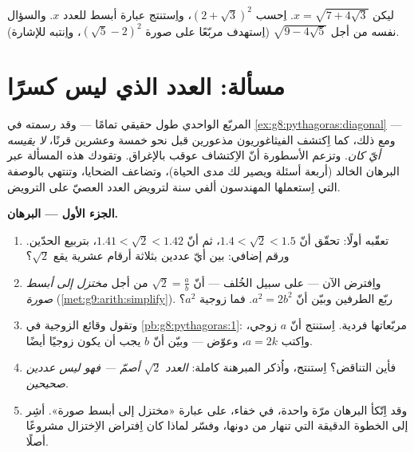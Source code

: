 \begin{exercise}[$\star\star\star$]\label{exo:g9:sqrt:10}
ليكن $x = \sqrt{7 + 4\sqrt3}$. اِحسب
$\left(2 + \sqrt3\right)^2$، واِستنتج عبارة أبسط للعدد $x$.
والسؤال نفسه من أجل $\sqrt{9 - 4\sqrt5}$ (اِستهدف مربّعًا على صورة
$\left(\sqrt5 - 2\right)^2$، واِنتبه للإشارة).
\end{exercise}

\section{مسألة: العدد الذي ليس كسرًا}

\begin{problem}
\label{pb:g9:sqrt:1}
 المربّع الواحدي طول حقيقي تمامًا --- وقد رسمته في
\cref{ex:g8:pythagoras:diagonal} --- ومع ذلك، كما اِكتشف
الفيثاغوريون مذعورين قبل نحو خمسة وعشرين قرنًا، \emph{لا يقيسه
أيّ  كان}. وتزعم الأسطورة أنّ الاِكتشاف عوقب بالإغراق.
وتقودك هذه المسألة عبر البرهان الخالد (أربعة أسئلة ويصير لك مدى
الحياة)، وتضاعف الضحايا، وتنتهي بالوصفة التي اِستعملها المهندسون
ألفي سنة لترويض العدد العصيّ على الترويض.

\medskip
\noindent\textbf{الجزء الأول --- البرهان.}
\begin{enumerate}
  \item تعقّبه أولًا: تحقّق أنّ
        $1.4 < \sqrt2 < 1.5$، ثم أنّ $1.41 < \sqrt2 < 1.42$،
        بتربيع الحدّين. ورقم إضافي: بين أيّ عددين بثلاثة أرقام
        عشرية يقع $\sqrt2$؟
  \item واِفترض الآن --- على سبيل الخُلف --- أنّ
        $\sqrt2 = \frac ab$ من أجل  \emph{مختزل إلى أبسط
        صورة} (\cref{met:g9:arith:simplify}). ربّع الطرفين وبيّن
        أنّ $a^2 = 2 b^2$. فما زوجية $a^2$؟
  \item وتقول وقائع الزوجية في \cref{pb:g8:pythagoras:1}:
         مربّعاتها فردية. اِستنتج أنّ $a$
        زوجي، واِكتب $a = 2k$، وعوّض --- وبيّن أنّ $b$ يجب
        أن يكون زوجيًا أيضًا.
  \item فأين التناقض؟ اِستنتج، واُذكر المبرهنة كاملة:
        \emph{العدد $\sqrt2$ أصمّ --- فهو ليس 
        عددين صحيحين}.
  \item وقد اِتّكأ البرهان مرّة واحدة، في خفاء، على عبارة «مختزل
        إلى أبسط صورة». أشِر إلى الخطوة الدقيقة التي تنهار من
        دونها، وفسّر لماذا كان اِفتراض الاِختزال مشروعًا أصلًا.
\end{enumerate}


\end{problem}
